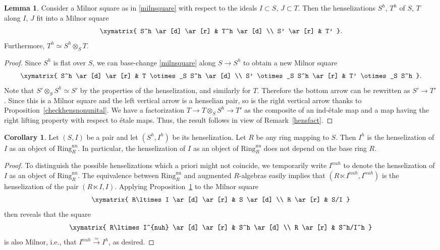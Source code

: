 \documentclass{amsart}
\theoremstyle{definition}
\newtheorem{lemma}[definition]{Lemma}
\newtheorem{corollary}[definition]{Corollary}
\newcommand{\isoto}{\stackrel{\simeq}{\to}}
\newcommand{\nur}{\mathrm{Ring}^{\mathrm{nu}}_R}
\begin{document}
\begin{lemma} 
\label{milnsquarehens} 
Consider a Milnor square as in \eqref{milnsquare} with respect to the ideals $I
\subset S$, $J \subset T$. 
Then the henselizations $S^h$, $T^h$ of $S$, $T$ along $I$, $J$ fit into a Milnor square 
\[ \xymatrix{
S^h \ar[d]  \ar[r] &  T^h \ar[d]  \\
S' \ar[r] &  T'
}.\]
Furthermore, $T^h \simeq S^h \otimes_S T$. 
\end{lemma} 
\begin{proof} 
Since $S^h$ is flat over $S$, we can base-change \eqref{milnsquare} along $S \to
S^h$ to obtain a
new Milnor square
\[  \xymatrix{
S^h \ar[d]  \ar[r] & T \otimes_S S^h    \ar[d]  \\
S' \otimes_S S^h \ar[r] &  T' \otimes_S S^h
}.  \]
Note that $S' \otimes_S S^h  \simeq S'$ by the properties of the henselization, and similarly for $T$. Therefore the bottom arrow can be rewritten as $S' \to T'$. 
Since this is a Milnor square and the left vertical arrow is a henselian pair,
so is the right vertical arrow thanks to Proposition~\ref{checkhensnonunital}.
We have a factorization  $T \to T \otimes_S S^h \to  T'$ as the composite of an
ind-\'etale map and a map having the right lifting property with respect to
\'etale maps. Thus, the result follows in view of Remark~\ref{hensfact}. 
\end{proof} 

\begin{corollary}\label{corollary_hens_ind_of_base}
 Let $(S, I)$ be a pair and let $(S^h, I^h)$ be its henselization. Let $R$
be any ring mapping to $S$. Then $I^h$
is the henselization of $I$ as an object of $\nur$. 
In particular, the henselization of $I$ as an object of $\nur$ does not
depend on the base ring $R$. 
\end{corollary} 
\begin{proof} 
To distinguish the possible henselizations which a priori might not coincide, we
temporarily write $I^{nuh}$ to denote the henselization of $I$ as an object of
$\nur$. The equivalence between $\nur$ and augmented $R$-algebras easily implies
that $(R\ltimes I^{nuh},I^{nuh})$ is the henselization of the pair $(R \ltimes I, I)$. Applying Proposition~\ref{milnsquarehens} to the Milnor square
\[ \xymatrix{
R\ltimes I \ar[d]  \ar[r] &  S \ar[d]  \\
R \ar[r] &  S/I
}\]
then reveals that the square
\[ \xymatrix{
R\ltimes I^{nuh} \ar[d]  \ar[r] &  S^h \ar[d]  \\
R \ar[r] &  S^h/I^h
}\]
is also Milnor, i.e., that $I^{nuh}\isoto I^h$, as desired.
\end{proof} 
\end{document}
